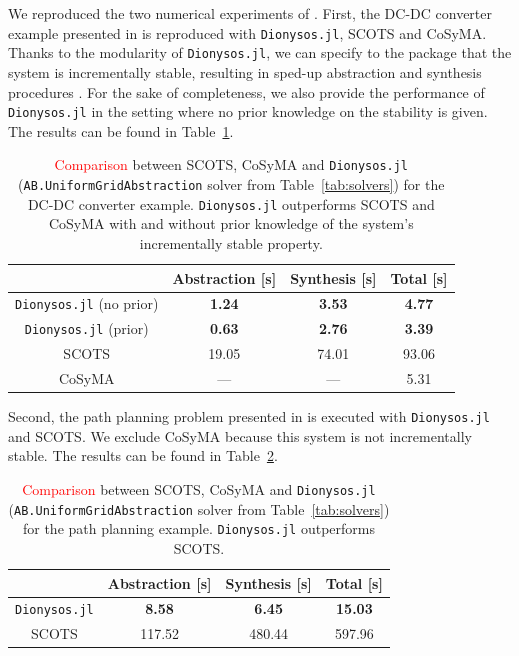 \documentclass{juliacon}
\begin{document}
\vskip 6pt

We reproduced the two numerical experiments of \cite{rungger2016scots}. First, the DC-DC converter example presented in \cite[Section 4.2]{rungger2016scots} is reproduced with \texttt{Dionysos.jl}, SCOTS and CoSyMA. Thanks to the modularity of \texttt{Dionysos.jl}, we can specify to the package that the system is incrementally stable, resulting in sped-up abstraction and synthesis procedures \cite{Camara2011}. For the sake of completeness, we also provide the performance of \texttt{Dionysos.jl} in the setting where no prior knowledge on the stability is given. The results can be found in Table~\ref{tab:dcdc_bench}.

\begin{table}[ht!]
    \centering
    \begin{tabular}{c|ccc}
        & Abstraction [s] & Synthesis [s] & Total [s] \\ 
        \hline 
        \texttt{Dionysos.jl} (no prior) & \textbf{1.24} & \textbf{3.53} & \textbf{4.77} \\
        \texttt{Dionysos.jl} (prior) & \textbf{0.63} & \textbf{2.76} & \textbf{3.39} \\
        SCOTS & 19.05 & 74.01 & 93.06 \\
        CoSyMA & --- & --- & 5.31
    \end{tabular}
    \caption{\textcolor{red}{Comparison} between SCOTS, CoSyMA and \texttt{Dionysos.jl} (\texttt{AB.UniformGridAbstraction} solver from Table~\ref{tab:solvers}) for the DC-DC converter example. \texttt{Dionysos.jl} outperforms SCOTS and CoSyMA with and without prior knowledge of the system's incrementally stable property.}
    \label{tab:dcdc_bench}
\end{table}

Second, the path planning problem presented in \cite[Section 4.1]{rungger2016scots} is executed with \texttt{Dionysos.jl} and SCOTS. We exclude CoSyMA because this system is not incrementally stable. The results can be found in Table~\ref{tab:vehicle_bench}.

\begin{table}[ht!]
    \centering
    \begin{tabular}{c|ccc}
        & Abstraction [s] & Synthesis [s] & Total [s] \\ 
        \hline 
        \texttt{Dionysos.jl} & \textbf{8.58} & \textbf{6.45} & \textbf{15.03} \\
        SCOTS & 117.52 & 480.44 & 597.96 \\
    \end{tabular}
    \caption{\textcolor{red}{Comparison} between SCOTS, CoSyMA and \texttt{Dionysos.jl} (\texttt{AB.UniformGridAbstraction} solver from Table~\ref{tab:solvers}) for the path planning example. \texttt{Dionysos.jl} outperforms SCOTS.}
    \label{tab:vehicle_bench}
\end{table}
\end{document}
